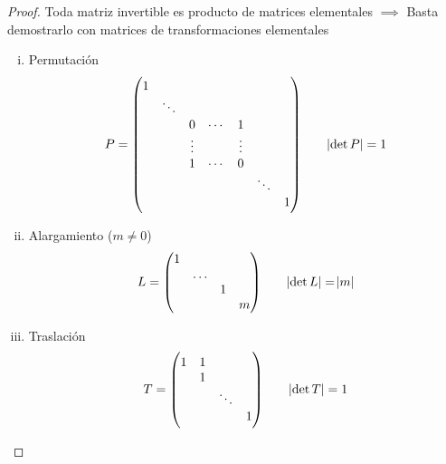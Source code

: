 \begin{proof}
    Toda matriz invertible es producto de matrices elementales $\implies$ Basta demostrarlo con matrices de transformaciones elementales
    \begin{enumerate}[i)]
        \item Permutación
            \[
                P = 
                \begin{pmatrix}
                    1 \\
                    & \ddots \\
                    & & 0 & \cdots & 1 \\
                    & & \vdots & & \vdots \\
                    & & 1 & \cdots & 0 \\
                    & & & & & \ddots \\
                    & & & & & & 1
                \end{pmatrix}
                \qquad \abs{\det P} = 1
            \]
        \item Alargamiento ($m \neq 0$)
            \[
                L =
                \begin{pmatrix}
                    1 \\
                    & \dots \\
                    & & 1 \\
                    & & & m
                \end{pmatrix}
                \qquad \abs{\det L } = \abs{m}
            \]
        \item Traslación
            \[
                T =
                \begin{pmatrix}
                    1 & 1 \\
                    & 1 \\
                    & & \ddots \\
                    & & & 1
                \end{pmatrix}
                \qquad \abs{\det T} = 1
            \]
    \end{enumerate}


\end{proof}
